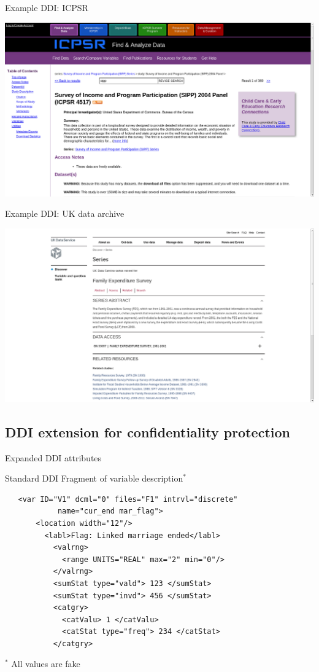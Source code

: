 \begin{frame}{Example DDI: ICPSR}
\begin{center}
\includegraphics[width=0.9\linewidth]{icpsr}
\end{center}
\end{frame}

\begin{frame}{Example DDI: UK data archive}
\begin{center}
\includegraphics[width=0.9\linewidth]{uk_data_archive}
\end{center}
\end{frame}

\subsection[Confidentiality]{DDI extension for confidentiality protection}

\begin{frame}[fragile]{Expanded DDI attributes}
\begin{block}{Standard DDI}
Fragment of variable description$^*$
\begin{verbatim}
   <var ID="V1" dcml="0" files="F1" intrvl="discrete" 
   			name="cur_end mar_flag">
       <location width="12"/>
         <labl>Flag: Linked marriage ended</labl>
           <valrng>
             <range UNITS="REAL" max="2" min="0"/>
           </valrng>
           <sumStat type="vald"> 123 </sumStat>
           <sumStat type="invd"> 456 </sumStat>
           <catgry>
             <catValu> 1 </catValu>
             <catStat type="freq"> 234 </catStat>
           </catgry>
\end{verbatim}
\end{block}
\tiny{$^*$ All values are fake}
\end{frame}

